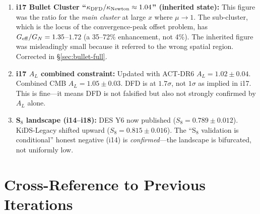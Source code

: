 \documentclass[11pt,a4paper]{article}
\newcommand{\Geff}{G_{\rm eff}}
\begin{document}
\begin{enumerate}
\item \textbf{i17 Bullet Cluster ``$\kappa_{\rm DFD}/\kappa_{\rm Newton}
  \approx 1.04$'' (inherited state):}  This figure was the ratio for the
  \emph{main cluster} at large $x$ where $\mu \to 1$.  The sub-cluster,
  which is the locus of the convergence-peak offset problem, has
  $\Geff/G_N = 1.35$--$1.72$ (a 35--72\% enhancement, not 4\%).  The
  inherited figure was misleadingly small because it referred to the
  wrong spatial region.  Corrected in \S\ref{sec:bullet-full}.

\item \textbf{i17 $A_L$ combined constraint:}  Updated with ACT-DR6
  $A_L = 1.02 \pm 0.04$.  Combined CMB $A_L = 1.05 \pm 0.03$.  DFD is
  at $1.7\sigma$, not $1\sigma$ as implied in i17.  This is fine---it
  means DFD is not falsified but also not strongly confirmed by $A_L$ alone.

\item \textbf{S$_8$ landscape (i14--i18):}  DES Y6 now published ($S_8 = 0.789
  \pm 0.012$).  KiDS-Legacy shifted upward ($S_8 = 0.815 \pm 0.016$).
  The ``S$_8$ validation is conditional'' honest negative (i14) is
  \emph{confirmed}---the landscape is bifurcated, not uniformly low.
\end{enumerate}


\section*{Cross-Reference to Previous Iterations}
\end{document}
